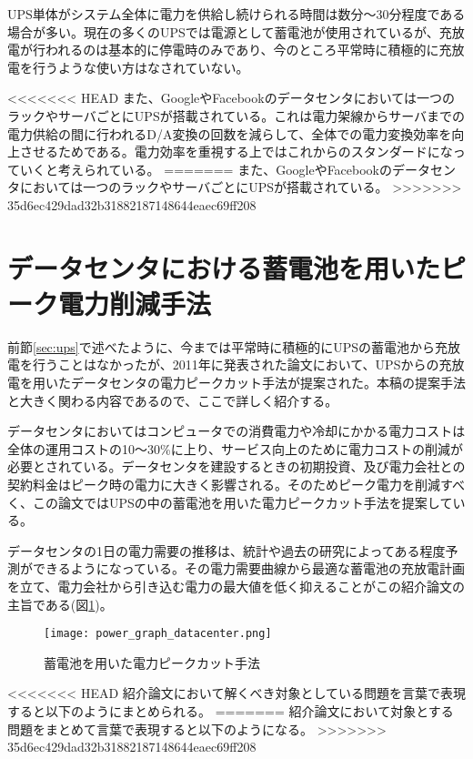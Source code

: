 UPS単体がシステム全体に電力を供給し続けられる時間は数分〜30分程度である場合が多い。現在の多くのUPSでは電源として蓄電池が使用されているが、充放電が行われるのは基本的に停電時のみであり、今のところ平常時に積極的に充放電を行うような使い方はなされていない。

<<<<<<< HEAD
また、GoogleやFacebookのデータセンタにおいては一つのラックやサーバごとにUPSが搭載されている\cite{Datacenter}。これは電力架線からサーバまでの電力供給の間に行われるD/A変換の回数を減らして、全体での電力変換効率を向上させるためである。電力効率を重視する上ではこれからのスタンダードになっていくと考えられている。
=======
また、GoogleやFacebookのデータセンタにおいては一つのラックやサーバごとにUPSが搭載されている。
>>>>>>> 35d6ec429dad32b31882187148644eaec69ff208


\section{データセンタにおける蓄電池を用いたピーク電力削減手法}
\label{sec:capping}

前節\ref{sec:ups}で述べたように、今までは平常時に積極的にUPSの蓄電池から充放電を行うことはなかったが、2011年に発表された論文\cite{Govindan:2011:BLT:2024723.2000105}において、UPSからの充放電を用いたデータセンタの電力ピークカット手法が提案された。本稿の提案手法と大きく関わる内容であるので、ここで詳しく紹介する。

データセンタにおいてはコンピュータでの消費電力や冷却にかかる電力コストは全体の運用コストの10〜30\%に上り、サービス向上のために電力コストの削減が必要とされている。データセンタを建設するときの初期投資、及び電力会社との契約料金はピーク時の電力に大きく影響される。そのためピーク電力を削減すべく、この論文ではUPSの中の蓄電池を用いた電力ピークカット手法を提案している。

データセンタの1日の電力需要の推移は、統計や過去の研究によってある程度予測ができるようになっている。その電力需要曲線から最適な蓄電池の充放電計画を立て、電力会社から引き込む電力の最大値を低く抑えることがこの紹介論文の主旨である(図\ref{fig:power_graph_datacenter})。
\begin{figure}[t]
 \begin{center}
  \texttt{[image: power\_graph\_datacenter.png]}
 \end{center}
 \caption{蓄電池を用いた電力ピークカット手法}
 \label{fig:power_graph_datacenter}
\end{figure}

<<<<<<< HEAD
紹介論文において解くべき対象としている問題を言葉で表現すると以下のようにまとめられる。
=======
紹介論文において対象とする問題をまとめて言葉で表現すると以下のようになる。
>>>>>>> 35d6ec429dad32b31882187148644eaec69ff208

